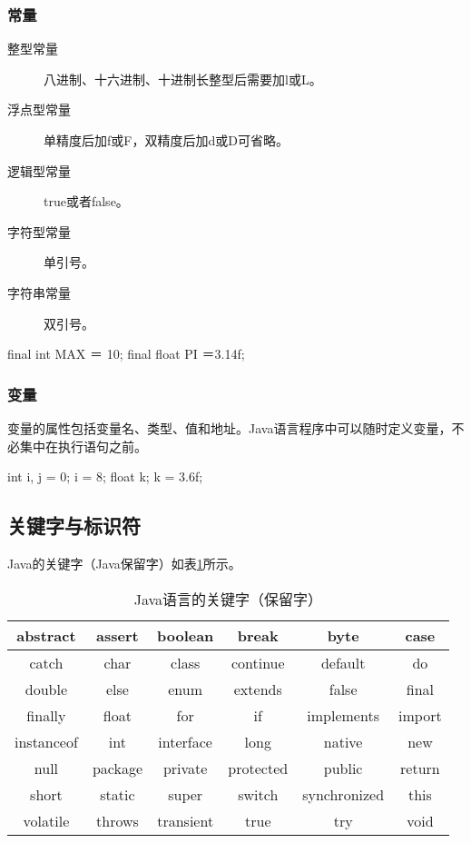 \subsubsection{常量}

\begin{description}
\item[整型常量] 八进制、十六进制、十进制长整型后需要加l或L。
\item[浮点型常量] 单精度后加f或F，双精度后加d或D可省略。
\item[逻辑型常量] true或者false。
\item[字符型常量] 单引号。
\item[字符串常量] 双引号。
\end{description}


\begin{javaCode}
  final int MAX ＝ 10;
  final float PI ＝3.14f;
\end{javaCode}

\subsubsection{变量}

变量的属性包括变量名、类型、值和地址。Java语言程序中可以随时定义变量，不必集中在执行语句之前。


\begin{javaCode}
  int i, j = 0;
  i = 8;
  float k;
  k = 3.6f;
\end{javaCode}


\subsection{关键字与标识符}

Java的关键字（Java保留字）如表\ref{tab:java-key-word}所示。

\begin{table}[!htbp]
  \centering
  \caption{Java语言的关键字（保留字）}
  \label{tab:java-key-word}
  \begin{tabular}{|c|c|c|c|c|c|}
    \hline
    abstract & assert & boolean & break & byte & case \\
    \hline
    catch & char & class & continue & default & do \\
    \hline
    double & else & enum & extends & false & final \\
    \hline    
    finally & float & for & if & implements & import \\
    \hline
    instanceof & int & interface & long & native & new \\
    \hline
    null & package & private & protected & public & return \\
    \hline
    short & static & super & switch & synchronized & this \\
    \hline
    volatile & throws & transient & true & try & void \\
    \hline
  \end{tabular}
\end{table}

